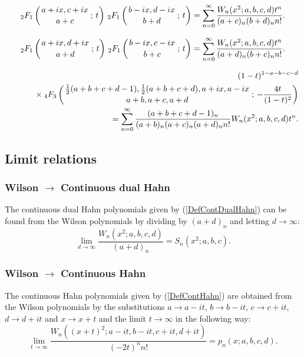 \documentclass[envcountchap,graybox]{svmono}
\newcounter{rom}
\newcommand{\hyp}[5]{\mbox{}_{#1}{F}_{#2}
\left(\genfrac{}{}{0pt}{}{#3}{#4}\,;\,#5\right)}
\newcommand{\mathindent}{\hspace{7.5mm}}
\newcommand{\hyp}[5]{\,\mbox{}_{#1}F_{#2}\!\left(
  \genfrac{}{}{0pt}{}{#3}{#4};#5\right)}
\begin{document}
\begin{equation}
\label{GenWilson2}
\hyp{2}{1}{a+ix,c+ix}{a+c}{t}\,\hyp{2}{1}{b-ix,d-ix}{b+d}{t}=
\sum_{n=0}^{\infty}\frac{W_n(x^2;a,b,c,d)t^n}{(a+c)_n(b+d)_nn!}.
\end{equation}

\begin{equation}
\label{GenWilson3}
\hyp{2}{1}{a+ix,d+ix}{a+d}{t}\,\hyp{2}{1}{b-ix,c-ix}{b+c}{t}=
\sum_{n=0}^{\infty}\frac{W_n(x^2;a,b,c,d)t^n}{(a+d)_n(b+c)_nn!}.
\end{equation}

\begin{eqnarray}
\label{GenWilson4}
& &(1-t)^{1-a-b-c-d}\nonumber\\
& &{}\mathindent\times\hyp{4}{3}{\frac{1}{2}(a+b+c+d-1),\frac{1}{2}(a+b+c+d),a+ix,a-ix}
{a+b,a+c,a+d}{-\frac{4t}{(1-t)^2}}\nonumber\\
& &{}=\sum_{n=0}^{\infty}\frac{(a+b+c+d-1)_n}{(a+b)_n(a+c)_n(a+d)_nn!}W_n(x^2;a,b,c,d)t^n.
\end{eqnarray}

\subsection*{Limit relations}

\subsubsection*{Wilson $\rightarrow$ Continuous dual Hahn}
The continuous dual Hahn polynomials given by (\ref{DefContDualHahn}) can be found from the
Wilson polynomials by dividing by $(a+d)_n$ and letting $d\rightarrow\infty$:
\begin{equation}
\lim_{d\rightarrow\infty}\frac{W_n(x^2;a,b,c,d)}{(a+d)_n}=S_n(x^2;a,b,c).
\end{equation}

\subsubsection*{Wilson $\rightarrow$ Continuous Hahn}
The continuous Hahn polynomials given by (\ref{DefContHahn}) are obtained from the Wilson
polynomials by the substitutions $a\rightarrow a-it$, $b\rightarrow b-it$, $c\rightarrow c+it$,
$d\rightarrow d+it$ and $x\rightarrow x+t$ and the limit $t\rightarrow\infty$ in the following
way:
\begin{equation}
\lim_{t\rightarrow\infty}
\frac{W_n((x+t)^2;a-it,b-it,c+it,d+it)}{(-2t)^nn!}=p_n(x;a,b,c,d).
\end{equation}
\end{document}
